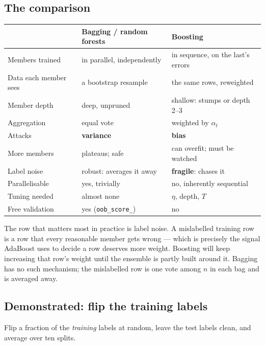\documentclass[11pt]{article}
\begin{document}
\subsection{The comparison}

\begin{center}
\small
\begin{tabular}{lll}
  \toprule
   & \textbf{Bagging / random forests} & \textbf{Boosting} \\
  \midrule
  Members trained & in parallel, independently & in sequence, on the last's
    errors \\
  Data each member sees & a bootstrap resample & the same rows, reweighted \\
  Member depth & deep, unpruned & shallow: stumps or depth 2--3 \\
  Aggregation & equal vote & weighted by $\alpha_t$ \\
  Attacks & \textbf{variance} & \textbf{bias} \\
  More members & plateaus; safe & can overfit; must be watched \\
  Label noise & robust: averages it away & \textbf{fragile}: chases it \\
  Parallelisable & yes, trivially & no, inherently sequential \\
  Tuning needed & almost none & $\eta$, depth, $T$ \\
  Free validation & yes (\texttt{oob\_score\_}) & no \\
  \bottomrule
\end{tabular}
\end{center}

The row that matters most in practice is label noise. A mislabelled training
row is a row that every reasonable member gets wrong --- which is precisely the
signal AdaBoost uses to decide a row deserves more weight. Boosting will keep
increasing that row's weight until the ensemble is partly built around it.
Bagging has no such mechanism; the mislabelled row is one vote among $n$ in
each bag and is averaged away.

\subsection{Demonstrated: flip the training labels}

Flip a fraction of the \emph{training} labels at random, leave the test labels
clean, and average over ten splits.
\end{document}
